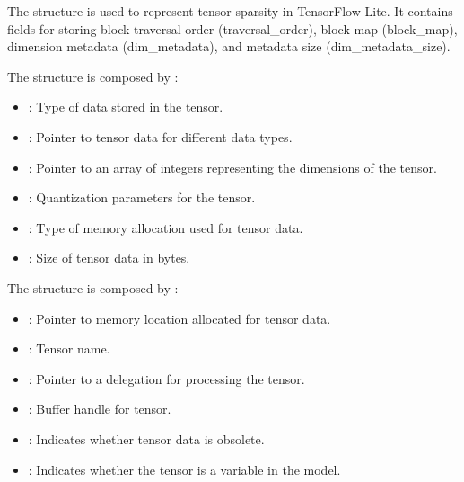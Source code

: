 The structure  is used to represent tensor sparsity in TensorFlow Lite. It contains fields for storing block traversal order (traversal\_order), block map (block\_map), dimension metadata (dim\_metadata), and metadata size (dim\_metadata\_size).

\begin{center}
    \label{Figure:Comatibily}
\end{center}


The structure is composed by : 

\begin{itemize}
    \item {}: Type of data stored in the tensor.
    \item {}: Pointer to tensor data for different data types.
    \item {}: Pointer to an array of integers representing the dimensions of the tensor.
    \item {}: Quantization parameters for the tensor.
    \item {}: Type of memory allocation used for tensor data.
    \item {} : Size of tensor data in bytes.
\end{itemize}

\begin{center}
    \label{Figure:Comatibily}
\end{center}

The structure is composed by : 

\begin{itemize}
    \item {}: Pointer to memory location allocated for tensor data.
    \item {}: Tensor name.
    \item {}: Pointer to a delegation for processing the tensor.
    \item {}: Buffer handle for tensor.
    \item {}: Indicates whether tensor data is obsolete.
    \item {}: Indicates whether the tensor is a variable in the model.
\end{itemize}

